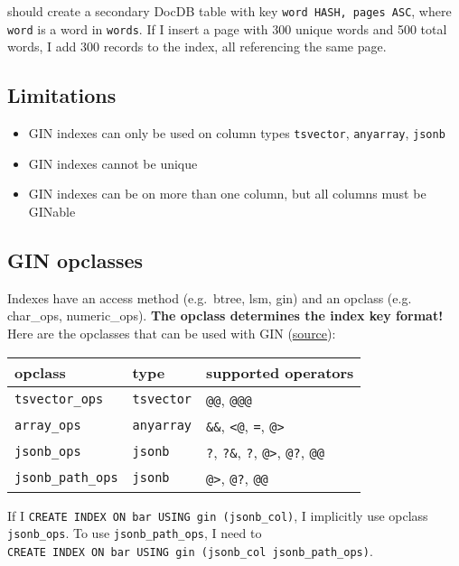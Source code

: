 \documentclass[
]{article}
\providecommand{\tightlist}{%
  \setlength{\itemsep}{0pt}\setlength{\parskip}{0pt}}
\begin{document}
should create a secondary DocDB table with key
\texttt{word\ HASH,\ pages\ ASC}, where \texttt{word} is a word in
\texttt{words}. If I insert a page with 300 unique words and 500 total
words, I add 300 records to the index, all referencing the same page.

\hypertarget{limitations}{%
\subsection{Limitations}\label{limitations}}

\begin{itemize}
\tightlist
\item
  GIN indexes can only be used on column types \texttt{tsvector},
  \texttt{anyarray}, \texttt{jsonb}
\item
  GIN indexes cannot be unique
\item
  GIN indexes can be on more than one column, but all columns must be
  GINable
\end{itemize}

\hypertarget{gin-opclasses}{%
\subsection{GIN opclasses}\label{gin-opclasses}}

Indexes have an access method (e.g.~btree, lsm, gin) and an opclass
(e.g. char\_ops, numeric\_ops). \textbf{The opclass determines the index
key format!} Here are the opclasses that can be used with GIN
(\href{https://www.postgresql.org/docs/current/gin-builtin-opclasses.html}{source}):

\begin{longtable}[]{@{}lll@{}}
\toprule
opclass & type & supported operators \\
\midrule
\endhead
\texttt{tsvector\_ops} & \texttt{tsvector} & \texttt{@@},
\texttt{@@@} \\
\texttt{array\_ops} & \texttt{anyarray} & \texttt{\&\&},
\texttt{\textless{}@}, \texttt{=}, \texttt{@\textgreater{}} \\
\texttt{jsonb\_ops} & \texttt{jsonb} & \texttt{?}, \texttt{?\&},
\texttt{?\textbar{}}, \texttt{@\textgreater{}}, \texttt{@?},
\texttt{@@} \\
\texttt{jsonb\_path\_ops} & \texttt{jsonb} & \texttt{@\textgreater{}},
\texttt{@?}, \texttt{@@} \\
\bottomrule
\end{longtable}

If I \texttt{CREATE\ INDEX\ ON\ bar\ USING\ gin\ (jsonb\_col)}, I
implicitly use opclass \texttt{jsonb\_ops}. To use
\texttt{jsonb\_path\_ops}, I need to
\texttt{CREATE\ INDEX\ ON\ bar\ USING\ gin\ (jsonb\_col\ jsonb\_path\_ops)}.
\end{document}
